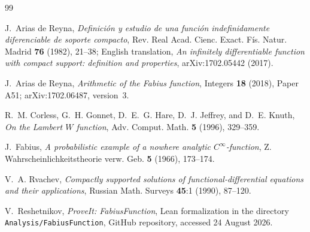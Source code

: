 \documentclass[11pt]{article}
\numberwithin{equation}{section}
\theoremstyle{definition}
\theoremstyle{remark}
\begin{document}
\begin{thebibliography}{99}

J.~Arias de Reyna,
\emph{Definici\'on y estudio de una funci\'on indefinidamente diferenciable
de soporte compacto},
Rev. Real Acad. Cienc. Exact. F\'is. Natur. Madrid \textbf{76} (1982),
21--38; English translation,
\emph{An infinitely differentiable function with compact support: definition
and properties}, arXiv:1702.05442 (2017).

J.~Arias de Reyna,
\emph{Arithmetic of the Fabius function},
Integers \textbf{18} (2018), Paper A51; arXiv:1702.06487, version~3.

R.~M. Corless, G.~H. Gonnet, D.~E.~G. Hare, D.~J. Jeffrey, and D.~E. Knuth,
\emph{On the Lambert $W$ function},
Adv. Comput. Math. \textbf{5} (1996), 329--359.

J.~Fabius,
\emph{A probabilistic example of a nowhere analytic $C^\infty$-function},
Z. Wahrscheinlichkeitstheorie verw. Geb. \textbf{5} (1966), 173--174.

V.~A. Rvachev,
\emph{Compactly supported solutions of functional-differential equations and
their applications},
Russian Math. Surveys \textbf{45}:1 (1990), 87--120.

V.~Reshetnikov,
\emph{ProveIt: FabiusFunction},
Lean formalization in the directory
\texttt{Analysis/FabiusFunction}, GitHub repository, accessed 24 August 2026.

\end{thebibliography}
\end{document}
